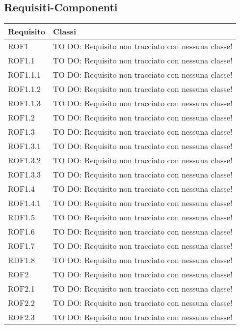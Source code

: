 \subsection{Requisiti-Componenti} %
\label{sub:componenti_requisiti}
\begin{center}
\def\arraystretch{1.5}
\bgroup
\begin{longtable}{| p{4cm} | p{8cm} |}
\hline
\textbf{Requisito} & \textbf{Classi} \\
\hline
ROF1 & TO DO: Requisito non tracciato con nessuna classe! \\
\hline
ROF1.1 & TO DO: Requisito non tracciato con nessuna classe! \\
\hline
ROF1.1.1 & TO DO: Requisito non tracciato con nessuna classe! \\
\hline
ROF1.1.2 & TO DO: Requisito non tracciato con nessuna classe! \\
\hline
ROF1.1.3 & TO DO: Requisito non tracciato con nessuna classe! \\
\hline
ROF1.2 & TO DO: Requisito non tracciato con nessuna classe! \\
\hline
ROF1.3 & TO DO: Requisito non tracciato con nessuna classe! \\
\hline
ROF1.3.1 & TO DO: Requisito non tracciato con nessuna classe! \\
\hline
ROF1.3.2 & TO DO: Requisito non tracciato con nessuna classe! \\
\hline
ROF1.3.3 & TO DO: Requisito non tracciato con nessuna classe! \\
\hline
ROF1.4 & TO DO: Requisito non tracciato con nessuna classe! \\
\hline
ROF1.4.1 & TO DO: Requisito non tracciato con nessuna classe! \\
\hline
RDF1.5 & TO DO: Requisito non tracciato con nessuna classe! \\
\hline
ROF1.6 & TO DO: Requisito non tracciato con nessuna classe! \\
\hline
ROF1.7 & TO DO: Requisito non tracciato con nessuna classe! \\
\hline
RDF1.8 & TO DO: Requisito non tracciato con nessuna classe! \\
\hline
ROF2 & TO DO: Requisito non tracciato con nessuna classe! \\
\hline
ROF2.1 & TO DO: Requisito non tracciato con nessuna classe! \\
\hline
ROF2.2 & TO DO: Requisito non tracciato con nessuna classe! \\
\hline
ROF2.3 & TO DO: Requisito non tracciato con nessuna classe! \\

\end{longtable}
\end{center}
